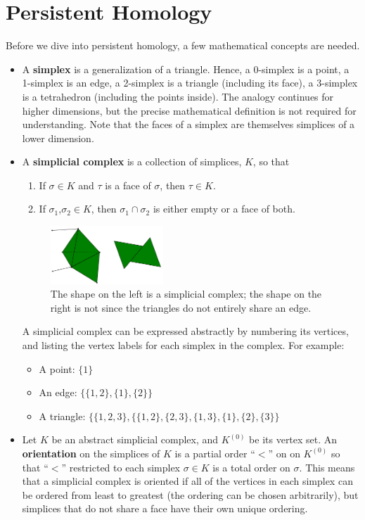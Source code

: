 \documentclass[a4paper,12pt]{report}
\begin{document}
\section{Persistent Homology}\label{sec:ph}

Before we dive into persistent homology, a few mathematical concepts are needed. 
\begin{itemize}
\item A \textbf{simplex} is a generalization of a triangle. Hence, a 0-simplex is a point, a 1-simplex is an edge, a 2-simplex is a triangle (including its face), a 3-simplex is a tetrahedron (including the points inside). The analogy continues for higher dimensions, but the precise mathematical definition is not required for understanding. Note that the faces of a simplex are themselves simplices of a lower dimension.
\item A \textbf{simplicial complex} is a collection of simplices, $K$, so that 
\begin{enumerate}
 \item If $\sigma\in K$ and $\tau$ is a face of $\sigma$, then $\tau\in K$.
 \item If $\sigma_1$,$\sigma_2\in K$, then $\sigma_1\cap\sigma_2$ is either empty or a face of both.
\end{enumerate}
  \singlespacing
\begin{figure}[!htbp]
 \centering
 \includegraphics[width=0.4\textwidth]{compare.pdf}
 \caption{\label{fig:compare} The shape on the left is a simplicial complex; the shape on the right is not since the triangles do not entirely share an edge.}
\end{figure}
\doublespacing
A simplicial complex can be expressed abstractly by numbering its vertices, and listing the vertex labels for each simplex in the complex. For example:
\begin{itemize}
  \item A point: $\{1\}$
  \item An edge: $\{\{1,2\},\{1\},\{2\}\}$
  \item A triangle: $\{\{1,2,3\},\{\{1,2\},\{2,3\},\{1,3\},\{1\},\{2\},\{3\}\}$
\end{itemize}
\item Let $K$ be an abstract simplicial complex, and $K^{(0)}$ be its vertex set. An \textbf{orientation}  on the simplices of $K$ is a partial order ``$<$'' on on $K^{(0)}$ so that ``$<$'' restricted to each simplex $\sigma\in K$ is a total order on $\sigma$. This means that a simplicial complex is oriented if all of the vertices in each simplex can be ordered from least to greatest (the ordering can be chosen arbitrarily), but simplices that do not share a face have their own unique ordering. 

\end{itemize}
\end{document}
